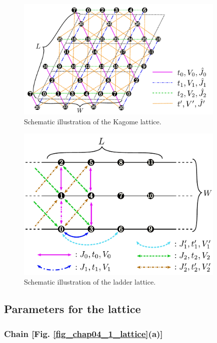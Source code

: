 \begin{itemize}
\begin{figure}[!tbhp]
  \begin{center}
    \includegraphics[width=10cm]{../figs/kagome.pdf}
    \caption{Schematic illustration of the Kagome lattice.
    }
    \label{fig_kagome}
  \end{center}
\end{figure}

\begin{figure}[!tbhp]
  \begin{center}
    \includegraphics[width=10cm]{../figs/ladder.pdf}
    \caption{Schematic illustration of the ladder lattice.
    }
    \label{fig_ladder}
  \end{center}
\end{figure}


\end{itemize}

\subsection{Parameters for the lattice}

\subsubsection{Chain [Fig. \ref{fig_chap04_1_lattice}(a)]}

